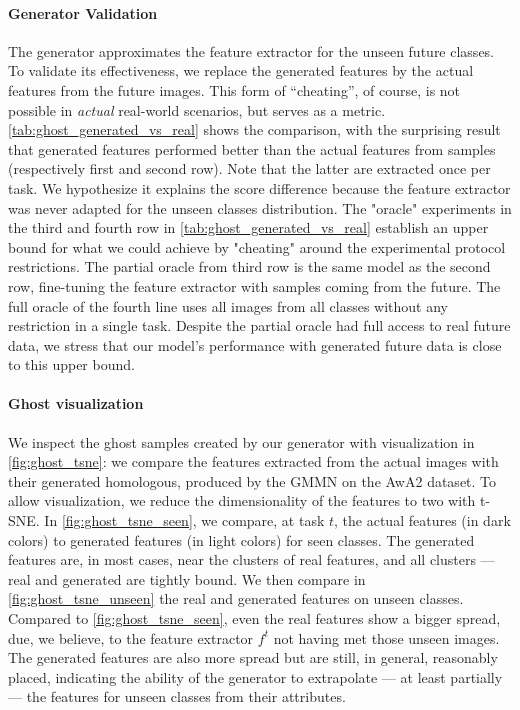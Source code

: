 \paragraph{Generator Validation} The generator approximates the feature extractor for the unseen
future classes. To validate its effectiveness, we replace the generated features by the actual
features from the future images. This form of “cheating”, of course, is not possible in
\textit{actual} real-world scenarios, but serves as a metric. \autoref{tab:ghost_generated_vs_real}
shows the comparison, with the surprising result that generated features performed better than the
actual features from samples (respectively first and second row). Note that the latter are extracted
once per task. We hypothesize it explains the score difference because the feature extractor was
never adapted for the unseen classes distribution. The "oracle" experiments in the third and fourth
row in \autoref{tab:ghost_generated_vs_real} establish an upper bound for what we could achieve by
"cheating" around the experimental protocol restrictions. The partial oracle from third row is the
same model as the second row, fine-tuning the feature extractor with samples coming from the future.
The full oracle of the fourth line uses all images from all classes without any restriction in a
single task. Despite the partial oracle had full access to real future data, we stress that our
model's performance with generated future data is close to this upper bound.




\paragraph{Ghost visualization} We inspect the ghost samples created by our generator with
visualization in \autoref{fig:ghost_tsne}: we compare the features extracted from the
actual images with their generated homologous, produced by the GMMN on the AwA2 dataset. To allow
visualization, we reduce the dimensionality of the features to two with t-SNE. In
\autoref{fig:ghost_tsne_seen}, we compare, at task $t$, the actual features (in dark colors) to generated
features (in light colors) for seen classes. The generated features are, in most cases, near the
clusters of real features, and all clusters — real and generated are tightly bound. We then compare
in \autoref{fig:ghost_tsne_unseen} the real and generated features on unseen classes. Compared to
\autoref{fig:ghost_tsne_seen}, even the real features show a bigger spread, due, we believe, to the
feature extractor $f^t$ not having met those unseen images. The generated features are also more
spread but are still, in general, reasonably placed, indicating the ability of the generator to
extrapolate — at least partially — the features for unseen classes from their attributes.

